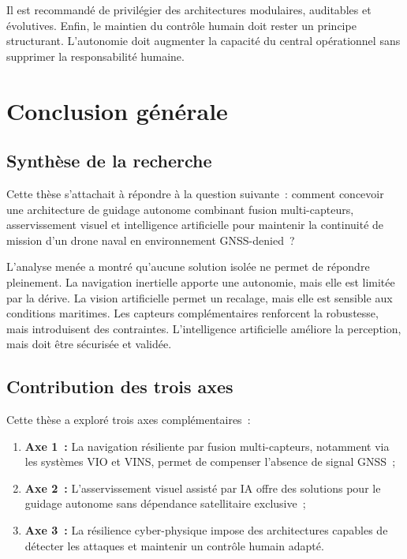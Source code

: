 \documentclass[12pt, a4paper, twoside, openright]{report}
\begin{document}
Il est recommandé de privilégier des architectures modulaires, auditables et évolutives. Enfin, le maintien du contrôle humain doit rester un principe structurant. L'autonomie doit augmenter la capacité du central opérationnel sans supprimer la responsabilité humaine.

\cleardoublepage

\chapter{Conclusion générale}

\section{Synthèse de la recherche}

Cette thèse s'attachait à répondre à la question suivante~: comment concevoir une architecture de guidage autonome combinant fusion multi-capteurs, asservissement visuel et intelligence artificielle pour maintenir la continuité de mission d'un drone naval en environnement GNSS-denied~?

L'analyse menée a montré qu'aucune solution isolée ne permet de répondre pleinement. La navigation inertielle apporte une autonomie, mais elle est limitée par la dérive. La vision artificielle permet un recalage, mais elle est sensible aux conditions maritimes. Les capteurs complémentaires renforcent la robustesse, mais introduisent des contraintes. L'intelligence artificielle améliore la perception, mais doit être sécurisée et validée.

\section{Contribution des trois axes}

Cette thèse a exploré trois axes complémentaires~:

\begin{enumerate}
    \item \textbf{Axe 1~:} La navigation résiliente par fusion multi-capteurs, notamment via les systèmes VIO et VINS, permet de compenser l'absence de signal GNSS~;
    
    \item \textbf{Axe 2~:} L'asservissement visuel assisté par IA offre des solutions pour le guidage autonome sans dépendance satellitaire exclusive~;
    
    \item \textbf{Axe 3~:} La résilience cyber-physique impose des architectures capables de détecter les attaques et maintenir un contrôle humain adapté.
\end{enumerate}
\end{document}
